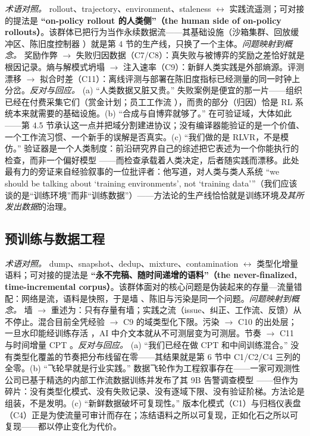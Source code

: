 \documentclass[10pt,fontset=fandol]{ctexart}
\begin{document}
\emph{术语对照。} rollout、trajectory、environment、staleness $\leftrightarrow$ 实践流遥测；可对接的提法是 \textbf{“on-policy rollout 的人类侧”（the human side of on-policy rollouts）}。该群体已把行为当作永续数据流——其基础设施（沙箱集群、回放缓冲区、陈旧度控制器 \cite{ref48,ref49}）就是第 4 节的生产线，只换了一个主体。\emph{问题映射到概念。} 奖励作弊 $\to$ 失败归因数据（C7/C8）：真失败与被博弈的奖励之差恰好就是根因记录。熵与解模式坍塌 \cite{ref11} $\to$ 注入速率（C9）：新鲜人类实践是外部熵源。评测漂移 $\to$ 拟合时差（C11）：离线评测与部署在陈旧度指标已经测量的同一时钟上分岔。\emph{反对与回应。} (a) “人类数据又脏又贵。” 失败案例是便宜的那一片——组织已经在付费采集它们（赏金计划；员工工作流 \cite{ref20}），而贵的部分（归因）恰是 RL 系统本来就需要的基础设施。(b) “合成与自博弈就够了。” 在可验证域，大体如此——第 4.5 节承认这一点并把域分割建进协议；没有编译器能验证的是一个价值、一个工作流习惯、一个新手的误解是否真实。(c) “我们做的是 RLVR，不是模仿。” 验证器是一个人类制度：前沿研究界自己的综述把它表述为一个你能执行的检查，而非一个偏好模型 \cite{ref66}——而检查承载着人类决定，后者随实践而漂移。此处最有力的旁证来自经验叙事的一位批评者：他写道，对人类与类人系统 ``we should be talking about `training environments', not `training data'''（我们应该谈的是“训练环境”而非“训练数据”）\cite{ref67}——方法论的生产线恰恰就是训练环境\emph{及其所发出数据}的治理。

\subsection{预训练与数据工程}

\emph{术语对照。} dump、snapshot、dedup、mixture、contamination $\leftrightarrow$ 类型化增量语料；可对接的提法是 \textbf{“永不完稿、随时间递增的语料”（the never-finalized, time-incremental corpus）}。该群体面对的核心问题是伪装起来的存量—流量错配：网络是流，语料是快照，于是墙 \cite{ref1}、陈旧与污染是同一个问题。\emph{问题映射到概念。} 墙 $\to$ 重述为：只有存量有墙；实践之流（issue、纠正、工作流、反馈）从不停止。混合目前全凭经验 $\to$ C9 的域类型化下限。污染 $\to$ C10 的出处层；一旦水印能经训练存活 \cite{ref44}，AI 中介文本就从不可测层变为可测层。节奏 $\to$ C11 与时间增量 CPT \cite{ref47}。\emph{反对与回应。} (a) “我们已经在做 CPT 和中间训练混合。” 没有类型化覆盖的节奏把分布线留在零——其结果就是第 6 节中 C1/C2/C4 三列的全零。(b) “飞轮早就是行业实践。” 数据飞轮作为工程叙事存在——一家可观测性公司已基于精选的内部工作流数据训练并发布了其 9B 告警调查模型 \cite{ref8}——但作为碎片：没有类型化模式、没有失败记录、没有逐域下限、没有验证阶梯。方法论是组装，不是发明。(c) “新鲜数据破坏可复现性。” 版本化模式（C1）与归档仪表盘（C4）正是为使流量可审计而存在；冻结语料之所以可复现，正如化石之所以可复现——都以停止变化为代价。
\end{document}
